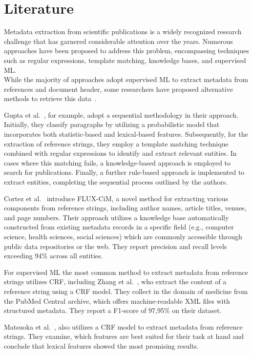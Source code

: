\section{Literature}
Metadata extraction from scientific publications is a widely recognized research challenge that has garnered considerable attention over the years. Numerous approaches have been proposed to address this problem, encompassing techniques such as regular expressions, template matching, knowledge bases, and supervised ML.\\
While the majority of approaches adopt supervised ML to extract metadata from references and document header, some researchers have proposed alternative methods to retrieve this data~\cite{tkaczyk2018machine}.\par
Gupta et al.~\cite{gupta2009new}, for example, adopt a sequential methodology in their approach. Initially, they classify paragraphs by utilizing a probabilistic model that incorporates both statistic-based and lexical-based features. Subsequently, for the extraction of reference strings, they employ a template matching technique combined with regular expressions to identify and extract relevant entities. In cases where this matching fails, a knowledge-based approach is employed to search for publications. Finally, a further rule-based approach is implemented to extract entities, completing the sequential process outlined by the authors.\par
Cortez et al.~\cite{cortez2009flexible} introduce FLUX-CiM, a novel method for extracting various components from reference strings, including author names, article titles, venues, and page numbers. Their approach utilizes a knowledge base automatically constructed from existing metadata records in a specific field (e.g., computer science, health sciences, social sciences) which are commonly accessible through public data repositories or the web. They report precision and recall levels exceeding 94\% across all entities.\par
For supervised ML the most common method to extract metadata from reference strings utilizes CRF, including Zhang et al.~\cite{zhang2011parsing}, who extract the content of a reference string using a CRF model. They collect in the domain of medicine from the PubMed Central archive, which offers machine-readable XML files with structured metadata. They report a F1-score of 97,95\% on their dataset.\par
Matsuoka et al.~\cite{matsuoka2016examination}, also utilizes a CRF model to extract metadata from reference strings. They examine, which features are best suited for their task at hand and conclude that lexical features showed the most promising results.\par

